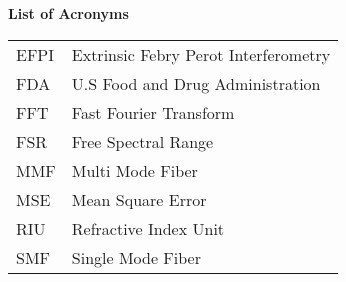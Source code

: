 \begin{center}
  \textbf{\LARGE{List of Acronyms}}
\end{center}
\vspace{2pt}
\begin{longtable}{ll}


EFPI & Extrinsic Febry Perot Interferometry \\
FDA & U.S Food and Drug Administration\\ 
FFT & Fast Fourier Transform \\
FSR & Free Spectral Range \\
MMF & Multi Mode Fiber \\
MSE & Mean Square Error \\
RIU & Refractive Index Unit \\
SMF & Single Mode Fiber  \\


\end{longtable}
